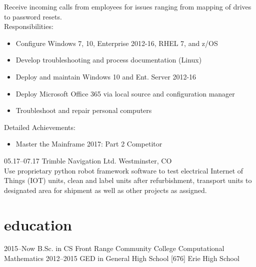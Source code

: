 \documentclass[]{cv-style}
\begin{document}
\begin{entrylist}
{  Receive incoming calls from employees for issues ranging from mapping of drives to password resets.\\
  Responsibilities:
    \begin{itemize}
  	  \item Configure Windows 7, 10, Enterprise 2012-16, RHEL 7, and z/OS
      \item Develop troubleshooting and process documentation (Linux)
      \item Deploy and maintain Windows 10 and Ent. Server 2012-16
      \item Deploy Microsoft Office 365 via local source and configuration manager
      \item Troubleshoot and repair personal computers
  \end{itemize}

  Detailed Achievements:
  \begin{itemize}
  	\item Master the Mainframe 2017: Part 2 Competitor
  \end{itemize}}
\entry
  {05.17--07.17}
  {Trimble Navigation Ltd.}
  {Westminster, CO}
  {\\
  Use proprietary python robot framework software to test electrical Internet of Things (IOT) units, clean and label units after refurbishment, transport units to designated area for shipment as well as other projects as assigned.}
\end{entrylist}

\vspace{-0.6cm}
\section{education}
\vspace{-0.3cm}
\begin{entrylist}
\entry
{2015--Now}
{B.Sc. {\normalfont in CS}}
{Front Range Community College}
{Computational Mathematics}
\entry
{2012--2015}
{GED {\normalfont in General High School [676]}}
{Erie High School}
{\vspace{-0.3cm}}
\end{entrylist}
\nopagebreak
\end{document}

